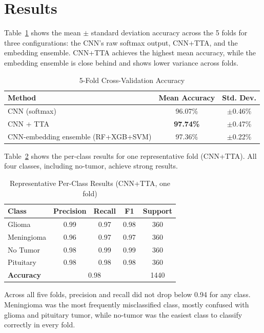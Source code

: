 \documentclass[conference]{IEEEtran}
\begin{document}
\section{Results}

Table~\ref{tab:cv_results} shows the mean $\pm$ standard deviation accuracy across the 5 folds for three configurations: the CNN's raw softmax output, CNN+TTA, and the embedding ensemble. CNN+TTA achieves the highest mean accuracy, while the embedding ensemble is close behind and shows lower variance across folds.

\begin{table}[!htbp]
\centering
\caption{5-Fold Cross-Validation Accuracy}
\begin{tabular}{|l|c|c|}
\hline
\textbf{Method} & \textbf{Mean Accuracy} & \textbf{Std. Dev.} \\ \hline
CNN (softmax)                          & 96.07\% & $\pm$0.46\% \\ \hline
CNN + TTA                              & \textbf{97.74\%} & $\pm$0.47\% \\ \hline
CNN-embedding ensemble (RF+XGB+SVM)    & 97.36\% & $\pm$0.22\% \\ \hline
\end{tabular}
\label{tab:cv_results}
\end{table}

Table~\ref{tab:perclass} shows the per-class results for one representative fold (CNN+TTA). All four classes, including no-tumor, achieve strong results.

\begin{table}[!htbp]
\centering
\caption{Representative Per-Class Results (CNN+TTA, one fold)}
\begin{tabular}{|l|c|c|c|c|}
\hline
\textbf{Class} & \textbf{Precision} & \textbf{Recall} & \textbf{F1} & \textbf{Support} \\ \hline
Glioma      & 0.99 & 0.97 & 0.98 & 360 \\ \hline
Meningioma  & 0.96 & 0.97 & 0.97 & 360 \\ \hline
No Tumor    & 0.98 & 0.99 & 0.99 & 360 \\ \hline
Pituitary   & 0.98 & 0.98 & 0.98 & 360 \\ \hline
\textbf{Accuracy} & \multicolumn{3}{c|}{0.98} & 1440 \\ \hline
\end{tabular}
\label{tab:perclass}
\end{table}

Across all five folds, precision and recall did not drop below 0.94 for any class. Meningioma was the most frequently misclassified class, mostly confused with glioma and pituitary tumor, while no-tumor was the easiest class to classify correctly in every fold.
\end{document}
